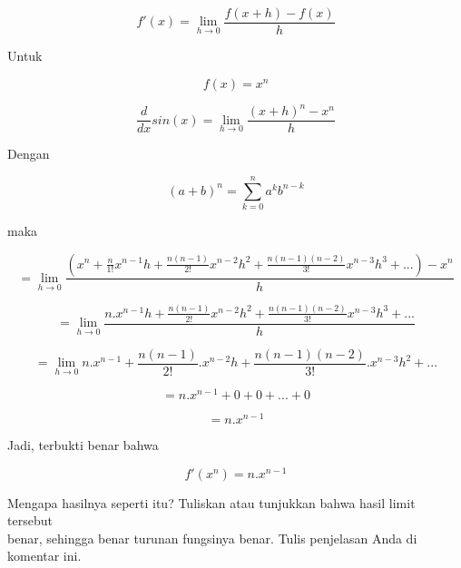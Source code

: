 \documentclass[a4paper,10pt]{article}
\begin{document}
\begin{eulernotebook}
\begin{eulercomment}
\end{eulercomment}
\begin{eulercomment}
\end{eulercomment}
\begin{eulerformula}
\[
f'(x) = \lim_{h\to 0} \frac{f(x+h)-f(x)}{h}
\]
\end{eulerformula}
\begin{eulercomment}
Untuk\\
\end{eulercomment}
\begin{eulerformula}
\[
f(x)=x^{n}
\]
\end{eulerformula}
\begin{eulerformula}
\[
\frac{d}{dx}sin(x) = \lim_{h\to 0} \frac{(x+h)^{n}-x^{n}}{h}
\]
\end{eulerformula}
\begin{eulercomment}
Dengan\\
\end{eulercomment}
\begin{eulerformula}
\[
(a+b)^{n}=\sum_{k=0}^n a^{k}b^{n-k}
\]
\end{eulerformula}
\begin{eulercomment}
maka\\
\end{eulercomment}
\begin{eulerformula}
\[
= \lim_{h\to 0} \frac{(x^{n}+\frac{n}{1!}x^{n-1}h+\frac{n(n-1)}{2!}x^{n-2}h^2+\frac{n(n-1)(n-2)}{3!}x^{n-3}h^{3}+...)-x^{n}}{h}
\]
\end{eulerformula}
\begin{eulerformula}
\[
= \lim_{h\to 0} \frac{n.x^{n-1}h+\frac{n(n-1)}{2!}x^{n-2}h^2+\frac{n(n-1)(n-2)}{3!}x^{n-3}h^{3}+...}{h}
\]
\end{eulerformula}
\begin{eulerformula}
\[
= \lim_{h\to 0} n.x^{n-1}+\frac{n(n-1)}{2!}.x^{n-2}h+\frac{n(n-1)(n-2)}{3!}.x^{n-3}h^{2}+...
\]
\end{eulerformula}
\begin{eulerformula}
\[
= n.x^{n-1}+0+0+...+0
\]
\end{eulerformula}
\begin{eulerformula}
\[
= n.x^{n-1}
\]
\end{eulerformula}
\begin{eulercomment}
Jadi, terbukti benar bahwa\\
\end{eulercomment}
\begin{eulerformula}
\[
f'(x^n) = n.x^{n-1}
\]
\end{eulerformula}
\eulersubheading{}
\begin{eulercomment}
Mengapa hasilnya seperti itu? Tuliskan atau tunjukkan bahwa hasil
limit tersebut\\
benar, sehingga benar turunan fungsinya benar.  Tulis penjelasan Anda
di komentar ini.


\end{eulercomment}
\end{eulernotebook}
\end{document}
